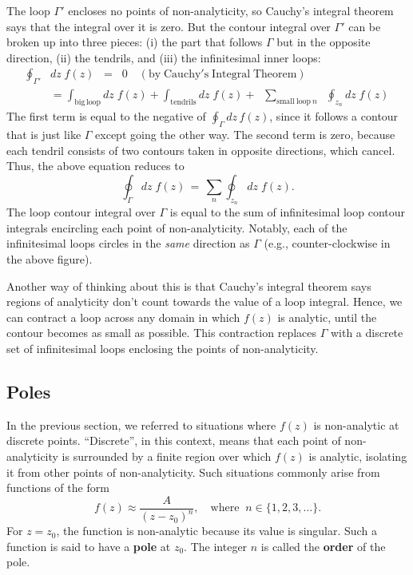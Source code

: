 \documentclass[10pt,a4paper]{article}
\begin{document}
The loop $\Gamma'$ encloses no points of non-analyticity, so Cauchy's
integral theorem says that the integral over it is zero. But the
contour integral over $\Gamma'$ can be broken up into three pieces:
(i) the part that follows $\Gamma$ but in the opposite direction, (ii)
the tendrils, and (iii) the infinitesimal inner loops:
\begin{align}
  \oint_{\Gamma'}& dz\; f(z)
  \;\;= \;\; 0 \quad (\mathrm{by}\;\mathrm{Cauchy's}\;\mathrm{Integral}\;\mathrm{Theorem}) \\
  &= \int_{\mathrm{big}\,\mathrm{loop}} dz\; f(z) + \int_{\mathrm{tendrils}} dz\; f(z) +\; \;\sum_{\mathrm{small~loop}~n}\;\; \oint_{z_n} dz\; f(z)
\end{align}
The first term is equal to the negative of $\oint_\Gamma dz \, f(z)$,
since it follows a contour that is just like $\Gamma$ except going the
other way. The second term is zero, because each tendril consists of two
contours taken in opposite directions, which cancel. Thus, the above
equation reduces to
\begin{equation}
\oint_\Gamma dz\; f(z) \,=\, \sum_n \oint_{z_n} dz\; f(z).
\end{equation}
The loop contour integral over $\Gamma$ is equal to the sum of
infinitesimal loop contour integrals encircling each point of
non-analyticity. Notably, each of the infinitesimal loops circles in the
\emph{same} direction as $\Gamma$ (e.g., counter-clockwise in the
above figure).

Another way of thinking about this is that Cauchy's integral theorem
says regions of analyticity don't count towards the value of a loop
integral. Hence, we can contract a loop across any domain in which
$f(z)$ is analytic, until the contour becomes as small as possible.
This contraction replaces $\Gamma$ with a discrete set of
infinitesimal loops enclosing the points of non-analyticity.

\subsection{Poles}
\label{poles}

In the previous section, we referred to situations where $f(z)$ is
non-analytic at discrete points. ``Discrete'', in this context, means
that each point of non-analyticity is surrounded by a finite region over
which $f(z)$ is analytic, isolating it from other points of
non-analyticity. Such situations commonly arise from functions of the
form
\begin{equation}
f(z) \approx \frac{A}{(z-z_0)^n}, \quad \mathrm{where}\;\; n\in\{1,2,3,\dots\}.
\end{equation}
For $z = z_0$, the function is non-analytic because its value is
singular. Such a function is said to have a \textbf{pole} at $z_0$.
The integer $n$ is called the \textbf{order} of the pole.
\end{document}
